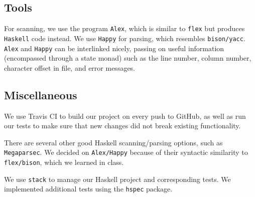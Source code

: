 \documentclass[11pt]{article}
\begin{document}
\subsection{Tools}
For scanning, we use the program \texttt{Alex}, which is similar to \texttt{flex}
but produces \texttt{Haskell} code instead. We use \texttt{Happy} for parsing,
which resembles \texttt{bison/yacc}. \texttt{Alex} and \texttt{Happy} can be interlinked
nicely, passing on useful information (encompassed through a state monad)
such as the line number, column number, character offset in file, and
error messages.
\subsection{Miscellaneous}
We use Travis CI to build our project on every push to GitHub, as well as
run our tests to make sure that new changes did not break
existing functionality.

There are several other good Haskell scanning/parsing options, such as
\texttt{Megaparsec}. We decided on \texttt{Alex/Happy} because of their syntactic
similarity to \texttt{flex/bison}, which we learned in class.

We use \texttt{stack} to manage our Haskell project and corresponding tests.
We implemented additional tests using the \texttt{hspec} package.

\end{document}
